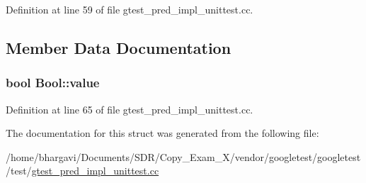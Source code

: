 Definition at line 59 of file gtest\+\_\+pred\+\_\+impl\+\_\+unittest.\+cc.



\subsection{Member Data Documentation}
\subsubsection[{\texorpdfstring{value}{value}}]{\setlength{\rightskip}{0pt plus 5cm}bool Bool\+::value}\hypertarget{struct_bool_a16be863c269f988cdcbe59f9d846a141}{}\label{struct_bool_a16be863c269f988cdcbe59f9d846a141}


Definition at line 65 of file gtest\+\_\+pred\+\_\+impl\+\_\+unittest.\+cc.



The documentation for this struct was generated from the following file\+:\begin{DoxyCompactItemize}
\item 
/home/bhargavi/\+Documents/\+S\+D\+R/\+Copy\+\_\+\+Exam\+\_\+X/vendor/googletest/googletest/test/\hyperlink{gtest__pred__impl__unittest_8cc}{gtest\+\_\+pred\+\_\+impl\+\_\+unittest.\+cc}\end{DoxyCompactItemize}
